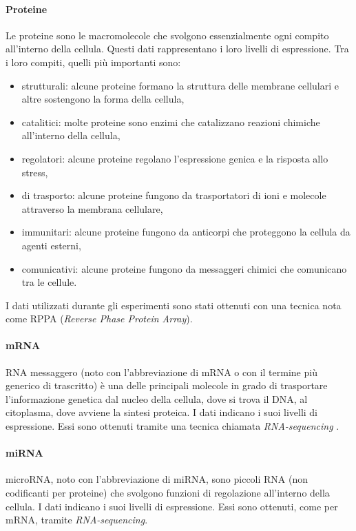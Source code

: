 \documentclass[12pt,italian]{report}
\begin{document}
	\paragraph{Proteine}
	\label{Proteine}
	Le proteine sono le macromolecole che svolgono essenzialmente ogni compito all'interno della cellula. Questi dati rappresentano i loro livelli di espressione.  Tra i loro compiti, quelli più importanti sono:
	\begin{itemize}
		\item strutturali: alcune proteine formano la struttura delle membrane cellulari e altre sostengono la forma della cellula,
		\item catalitici: molte proteine sono enzimi che catalizzano reazioni chimiche all'interno della cellula,
		\item regolatori: alcune proteine regolano l'espressione genica e la risposta allo stress,
		\item di trasporto: alcune proteine fungono da trasportatori di ioni e molecole attraverso la membrana cellulare,
		\item immunitari: alcune proteine fungono da anticorpi che proteggono la cellula da agenti esterni,
		\item comunicativi: alcune proteine fungono da messaggeri chimici che comunicano tra le cellule.
	\end{itemize}
	I dati utilizzati durante gli esperimenti sono stati ottenuti con una tecnica nota come RPPA \cite{Coarfa2021-eh} (\textit{Reverse Phase Protein Array}).
	
	\paragraph{mRNA}
	\label{mRNA}
	RNA messaggero (noto con l'abbreviazione di mRNA o con il termine più generico di trascritto) è una delle principali molecole in grado di trasportare l'informazione genetica dal nucleo della cellula, dove si trova il DNA, al citoplasma, dove avviene la sintesi proteica. I dati indicano i suoi livelli di espressione. Essi sono ottenuti tramite una tecnica chiamata \textit{RNA-sequencing} \cite{Wang2009-wi}. 
	
	\paragraph{miRNA}
	\label{miRNA}
	microRNA, noto con l'abbreviazione di miRNA, sono piccoli RNA (non codificanti per proteine) che svolgono funzioni di regolazione all'interno della cellula.
	I dati indicano i suoi livelli di espressione. Essi sono ottenuti, come per mRNA, tramite \textit{RNA-sequencing}.
	
\end{document}

